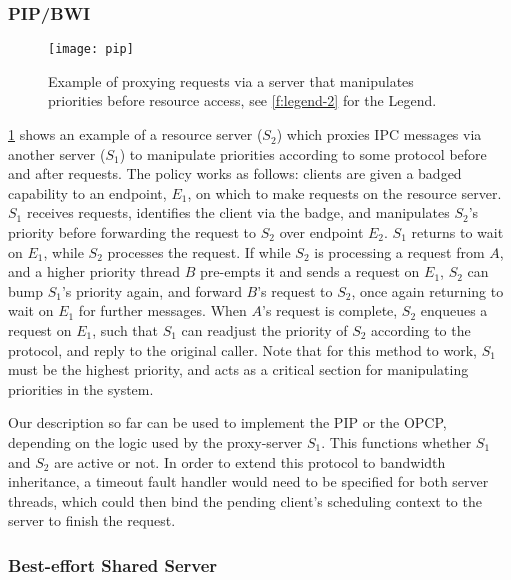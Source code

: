 \subsubsection{\gls{PIP}/\gls{BWI}}
\label{sec:model-pip-bwi}

\begin{figure}
    \centering
    \texttt{[image: pip]}
    \caption{Example of proxying requests via a server that manipulates priorities before resource
    access, see \cref{f:legend-2} for the Legend.}
    \label{f:model-pip}
\end{figure}
 
\cref{f:model-pip} shows an example of a resource server ($S_{2}$) which proxies IPC messages via
another server ($S_{1}$) to manipulate priorities according to some protocol before and after
requests. The policy works as follows: clients are given a badged capability to an endpoint,
$E_{1}$, on which to make requests on the resource server. $S_{1}$ receives requests, identifies 
the client via the badge, and manipulates $S_{2}$'s priority before forwarding the request to
$S_{2}$ over endpoint $E_{2}$. $S_{1}$ returns to wait on $E_{1}$, while $S_{2}$ processes the
request. If while $S_{2}$ is processing a request from $A$, and a higher priority thread $B$
pre-empts it and sends a request on $E_{1}$, $S_{2}$ can bump $S_{1}$'s priority again, and forward
$B$'s request to $S_{2}$, once again returning to wait on $E_{1}$ for further messages. When $A$'s
request is complete, $S_{2}$ enqueues a request on $E_{1}$, such that $S_{1}$ can readjust the
priority of $S_{2}$ according to the protocol, and reply to the original caller. Note that for this
method to work, $S_{1}$ must be the highest priority, and acts as a critical section for
manipulating priorities in the system.

Our description so far can be used to implement the \gls{PIP} or the \gls{OPCP}, depending on 
the logic used by the proxy-server $S_{1}$. This functions whether $S_{1}$ and $S_{2}$ are active or
not. In order to extend this protocol to bandwidth inheritance, a timeout fault handler would need
to be specified for both server threads, which could then bind the pending client's scheduling
context to the server to finish the request. 

\subsubsection{Best-effort Shared Server}
\label{sec:best-effort}

